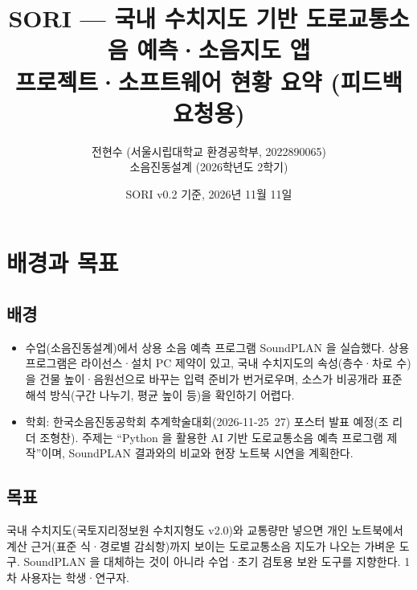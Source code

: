 \documentclass[10pt,a4paper]{article}
\title{\textbf{SORI — 국내 수치지도 기반 도로교통소음 예측·소음지도 앱}\\[2mm]
\large 프로젝트·소프트웨어 현황 요약 (피드백 요청용)}
\author{전현수 (서울시립대학교 환경공학부, 2022890065) \\ 소음진동설계 (2026학년도 2학기)}
\date{SORI v0.2 기준, 2026년 11월 11일}
\begin{document}
\maketitle

\begin{center}
\end{center}

\tableofcontents

\section{배경과 목표}
\subsection{배경}
\begin{itemize}
\item 수업(소음진동설계)에서 상용 소음 예측 프로그램 SoundPLAN 을 실습했다. 상용 프로그램은 라이선스·설치 PC 제약이 있고, 국내 수치지도의 속성(층수·차로 수)을 건물 높이·음원선으로 바꾸는 입력 준비가 번거로우며, 소스가 비공개라 표준 해석 방식(구간 나누기, 평균 높이 등)을 확인하기 어렵다.
\item 학회: 한국소음진동공학회 추계학술대회(2026-11-25~27) 포스터 발표 예정(조 리더 조형찬). 주제는 ``Python 을 활용한 AI 기반 도로교통소음 예측 프로그램 제작''이며, SoundPLAN 결과와의 비교와 현장 노트북 시연을 계획한다.
\end{itemize}

\subsection{목표}
국내 수치지도(국토지리정보원 수치지형도 v2.0)와 교통량만 넣으면 개인 노트북에서 계산 근거(표준 식·경로별 감쇠항)까지 보이는 도로교통소음 지도가 나오는 가벼운 도구. SoundPLAN 을 대체하는 것이 아니라 수업·초기 검토용 보완 도구를 지향한다. 1차 사용자는 학생·연구자.
\end{document}

